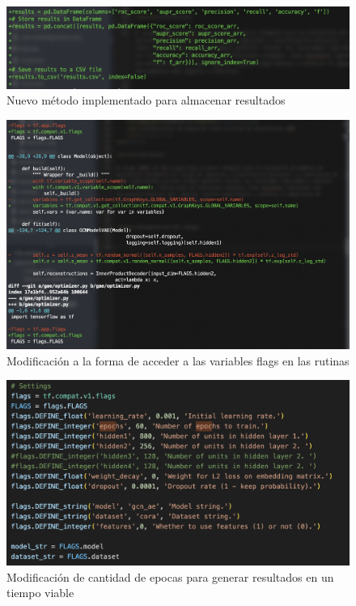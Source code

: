 \begin{figure}
    \centering
    \includegraphics[width=1\linewidth]{fig/code3.png}
    \caption{Nuevo método implementado para almacenar resultados}
    \label{fig:enter-label}
\end{figure}


\begin{figure}
    \centering
    \includegraphics[width=1\linewidth]{fig/code4.png}
    \caption{Modificación a la forma de acceder a las variables flags en las rutinas}
    \label{fig:enter-label}
\end{figure}


\begin{figure}
    \centering
    \includegraphics[width=1\linewidth]{fig/epoch.png}
    \caption{Modificación de cantidad de epocas para generar resultados en un tiempo viable
    }
    \label{fig:enter-label}
\end{figure}




